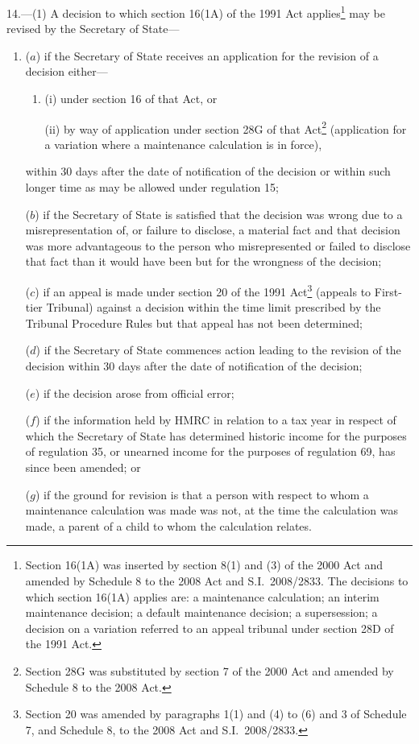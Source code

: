 \documentclass[12pt,a4paper]{article}
\begin{document}
14.---(1)  A decision to which section 16(1A) of the 1991 Act applies\footnote{Section 16(1A) was inserted by section 8(1) and (3) of the 2000 Act and amended by Schedule 8 to the 2008 Act and S.I.~2008/2833. The decisions to which section 16(1A) applies are: a maintenance calculation; an interim maintenance decision; a default maintenance decision; a supersession; a decision on a variation referred to an appeal tribunal under section 28D of the 1991 Act.} may be revised by the Secretary of State—
\begin{enumerate}\item[]
($a$) if the Secretary of State receives an application for the revision of a decision either—
\begin{enumerate}\item[]
(i) under section 16 of that Act, or

(ii) by way of application under section 28G of that Act\footnote{Section 28G was substituted by section 7 of the 2000 Act and amended by Schedule 8 to the 2008 Act.} (application for a variation where a maintenance calculation is in force),
\end{enumerate}
within 30 days after the date of notification of the decision or within such longer time as may be allowed under regulation 15;

($b$) if the Secretary of State is satisfied that the decision was wrong due to a misrepresentation of, or failure to disclose, a material fact and that decision was more advantageous to the person who misrepresented or failed to disclose that fact than it would have been but for the wrongness of the decision;

($c$) if an appeal is made under section 20 of the 1991 Act\footnote{Section 20 was amended by paragraphs 1(1) and (4) to (6) and 3 of Schedule 7, and Schedule 8, to the 2008 Act and S.I.~2008/2833.} (appeals to First-tier Tribunal) against a decision within the time limit prescribed by the Tribunal Procedure Rules but that appeal has not been determined;

($d$) if the Secretary of State commences action leading to the revision of the decision within 30 days after the date of notification of the decision;

($e$) if the decision arose from official error;

($f$) if the information held by HMRC in relation to a tax year in respect of which the Secretary of State has determined historic income for the purposes of regulation 35, or unearned income for the purposes of regulation 69, has since been amended; or

($g$) if the ground for revision is that a person with respect to whom a maintenance calculation was made was not, at the time the calculation was made, a parent of a child to whom the calculation relates.
\end{enumerate}
\end{document}

